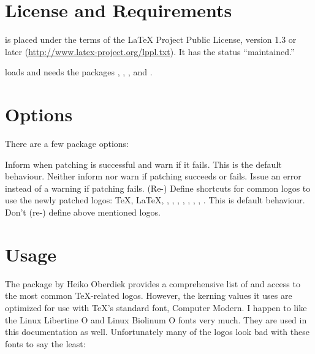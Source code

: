 \documentclass{cnpkgdoc}
\begin{document}
\section{License and Requirements}
\lbthlpt is placed under the terms of the \LaTeX{} Project Public License,
version 1.3 or later (\url{http://www.latex-project.org/lppl.txt}).  It has
the status ``maintained.''

\lbthlpt loads and needs the packages , ,
,  and .

\section{Options}
There are a few package options:
\begin{beschreibung}
 \newline
   Inform when patching is successful and warn if it fails. This is the default
   behaviour.
 \newline
   Neither inform nor warn if patching succeeds or fails.
 \newline
   Issue an error instead of a warning if patching fails.
 \newline
   (Re-) Define shortcuts for common logos to use the newly patched 
   logos:  \TeX,  \LaTeX,  \LaTeXe, 
   \LaTeXTeX,  \pdfTeX,  \pdfLaTeX,  \XeTeX,
    \XeLaTeX,  \LuaTeX,  \LuaLaTeX. This
   is default behaviour.
 \newline
   Don't (re-) define above mentioned logos.
\end{beschreibung}

\section{Usage}
The  package by Heiko Oberdiek provides a comprehensive list of and
access to the most common \TeX-related logos. However, the kerning values it uses
are optimized for use with \TeX's standard font, Computer Modern. I happen to
like the Linux Libertine O and Linux Biolinum O fonts very much. They are used
in this documentation as well. Unfortunately many of the logos look bad with these
fonts to say the least:
\end{document}

